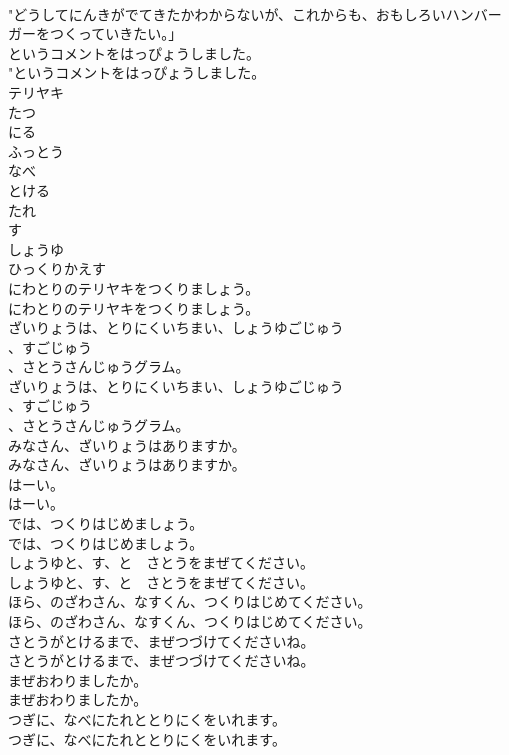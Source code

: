 \documentclass[8pt]{extreport}
\begin{document}
\begin{CJK}{UTF8}{min}
\\	"どうしてにんきがでてきたかわからないが、これからも、おもしろいハンバーガーをつくっていきたい。」 
\\	というコメントをはっぴょうしました。	
\\	"というコメントをはっぴょうしました。 
\\	テリヤキ
\\	たつ
\\	にる
\\	ふっとう
\\	なべ
\\	とける
\\	たれ
\\	す
\\	しょうゆ
\\	ひっくりかえす
\\	にわとりのテリヤキをつくりましょう。	
\\	にわとりのテリヤキをつくりましょう。 
\\	ざいりょうは、とりにくいちまい、しょうゆごじゅう
\\	、すごじゅう
\\	、さとうさんじゅうグラム。	
\\	ざいりょうは、とりにくいちまい、しょうゆごじゅう
\\	、すごじゅう
\\	、さとうさんじゅうグラム。 
\\	みなさん、ざいりょうはありますか。	
\\	みなさん、ざいりょうはありますか。 
\\	はーい。	
\\	はーい。 
\\	では、つくりはじめましょう。	
\\	では、つくりはじめましょう。 
\\	しょうゆと、す、と　さとうをまぜてください。	
\\	しょうゆと、す、と　さとうをまぜてください。 
\\	ほら、のざわさん、なすくん、つくりはじめてください。	
\\	ほら、のざわさん、なすくん、つくりはじめてください。 
\\	さとうがとけるまで、まぜつづけてくださいね。	
\\	さとうがとけるまで、まぜつづけてくださいね。 
\\	まぜおわりましたか。	
\\	まぜおわりましたか。 
\\	つぎに、なべにたれととりにくをいれます。	
\\	つぎに、なべにたれととりにくをいれます。 

\end{CJK}
\end{document}
